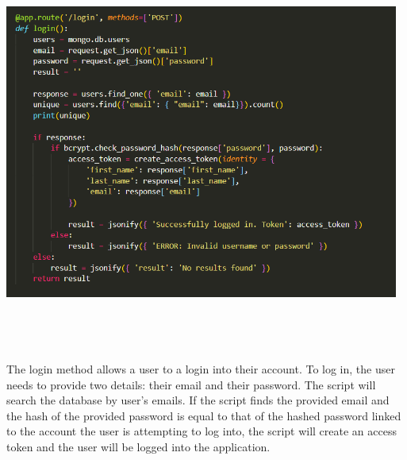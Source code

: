 \newpage
\begin{center}
    \includegraphics[width=13cm,height=13cm,keepaspectratio]{images/backend3}
\end{center}
The login method allows a user to a login into their account. To log in, the user needs to provide two details: their email and their password. The script will search the database by user's emails. If the script finds the provided email and the hash of the provided password is equal to that of the hashed password linked to the account the user is attempting to log into, the script will create an access token and the user will be logged into the application. 

\newpage
